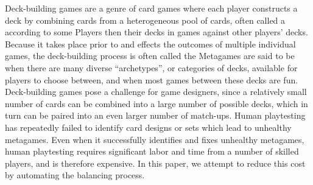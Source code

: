 
Deck-building games are a genre of card games where each player
constructs a deck by combining cards from a heterogeneous pool of
cards, often called a  according to some
 Players then  their
decks in games against other players' decks. Because it takes place
prior to and effects the outcomes of multiple individual games, the
deck-building process is often called the 
Metagames are said to be  when there are many diverse
\enquote{archetypes}, or categories of decks, available for players to
choose between, and when most games between these decks are
fun. Deck-building games pose a challenge for game designers, since a
relatively small number of cards can be combined into a large number
of possible decks, which in turn can be paired into an even larger
number of match-ups. Human playtesting has repeatedly failed to
identify card designs or sets which lead to unhealthy metagames.
Even when it successfully identifies and fixes unhealthy metagames,
human playtesting requires significant labor and time from a number of
skilled players, and is therefore expensive. In this paper, we attempt
to reduce this cost by automating the balancing process.
